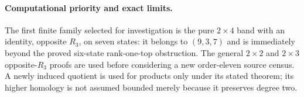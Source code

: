 \paragraph{Computational priority and exact limits.}
The first finite family selected for investigation is the pure
$2\times4$ band with an identity, opposite $R_3$, on seven states:
it belongs to $(9,3,7)$ and is immediately beyond the proved
six-state rank-one-top obstruction.  The general $2\times2$ and
$2\times3$ opposite-$R_3$ proofs are used before considering a new
order-eleven source census.  A newly induced quotient is used for
products only under its stated theorem; its higher homology is not
assumed bounded merely because it preserves degree two.
